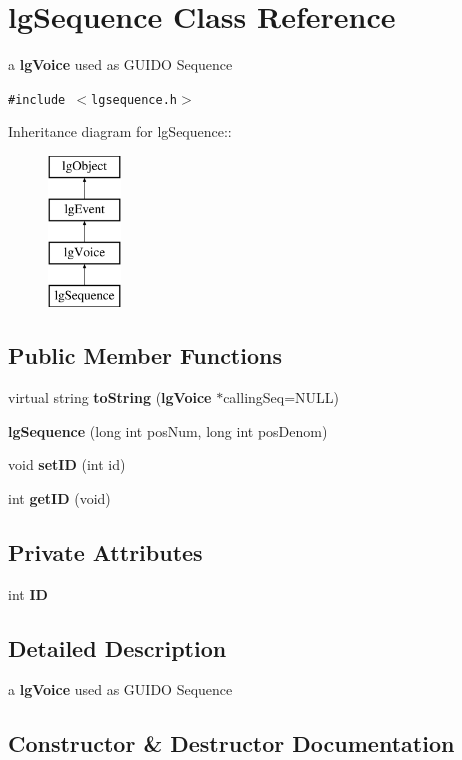 \section{lg\-Sequence Class Reference}
\label{classlgSequence}
a {\bf lg\-Voice} used as GUIDO Sequence  


{\tt \#include $<$lgsequence.h$>$}

Inheritance diagram for lg\-Sequence::\begin{figure}[H]
\begin{center}
\leavevmode
\includegraphics[height=4cm]{classlgSequence}
\end{center}
\end{figure}
\subsection*{Public Member Functions}
\begin{CompactItemize}
\item 
virtual string {\bf to\-String} ({\bf lg\-Voice} $\ast$calling\-Seq=NULL)
\item 
{\bf lg\-Sequence} (long int pos\-Num, long int pos\-Denom)
\item 
void {\bf set\-ID} (int id)
\item 
int {\bf get\-ID} (void)
\end{CompactItemize}
\subsection*{Private Attributes}
\begin{CompactItemize}
\item 
int {\bf ID}
\end{CompactItemize}


\subsection{Detailed Description}
a {\bf lg\-Voice} used as GUIDO Sequence 



\subsection{Constructor \& Destructor Documentation}
